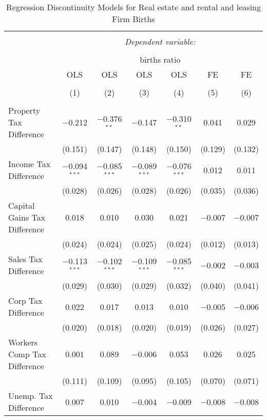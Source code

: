 
\begin{table}[!htbp] \centering 
  \caption{Regression Discontinuity Models for  Real estate and rental and leasing Firm Births} 
  \label{53rd} 
\footnotesize 
\begin{tabular}{@{\extracolsep{5pt}}lcccccc} 
\\[-1.8ex]\hline 
\hline \\[-1.8ex] 
 & \multicolumn{6}{c}{\textit{Dependent variable:}} \\ 
\cline{2-7} 
\\[-1.8ex] & \multicolumn{6}{c}{births ratio} \\ 
 & OLS & OLS & OLS & OLS & FE & FE \\ 
\\[-1.8ex] & (1) & (2) & (3) & (4) & (5) & (6)\\ 
\hline \\[-1.8ex] 
 Property Tax Difference & $-$0.212 & $-$0.376$^{**}$ & $-$0.147 & $-$0.310$^{**}$ & 0.041 & 0.029 \\ 
  & (0.151) & (0.147) & (0.148) & (0.150) & (0.129) & (0.132) \\ 
  Income Tax Difference & $-$0.094$^{***}$ & $-$0.085$^{***}$ & $-$0.089$^{***}$ & $-$0.076$^{***}$ & 0.012 & 0.011 \\ 
  & (0.028) & (0.026) & (0.028) & (0.026) & (0.035) & (0.036) \\ 
  Capital Gains Tax Difference & 0.018 & 0.010 & 0.030 & 0.021 & $-$0.007 & $-$0.007 \\ 
  & (0.024) & (0.024) & (0.025) & (0.024) & (0.012) & (0.013) \\ 
  Sales Tax Difference & $-$0.113$^{***}$ & $-$0.102$^{***}$ & $-$0.109$^{***}$ & $-$0.085$^{***}$ & $-$0.002 & $-$0.003 \\ 
  & (0.029) & (0.030) & (0.029) & (0.032) & (0.040) & (0.041) \\ 
  Corp Tax Difference & 0.022 & 0.017 & 0.013 & 0.010 & $-$0.005 & $-$0.006 \\ 
  & (0.020) & (0.018) & (0.020) & (0.019) & (0.026) & (0.027) \\ 
  Workers Comp Tax Difference & 0.001 & 0.089 & $-$0.006 & 0.053 & 0.026 & 0.025 \\ 
  & (0.111) & (0.109) & (0.095) & (0.105) & (0.070) & (0.071) \\ 
  Unemp. Tax Difference & 0.007 & 0.010 & $-$0.004 & $-$0.009 & $-$0.008 & $-$0.008 \\ 

\end{tabular}
\end{table}
